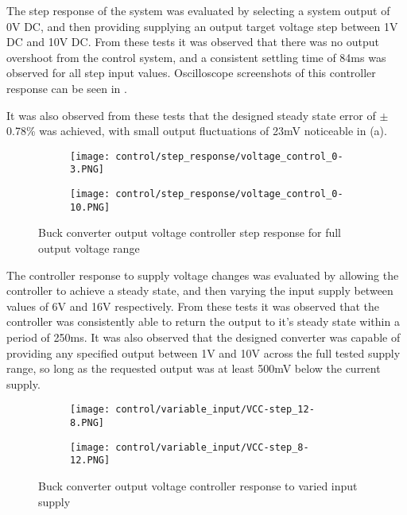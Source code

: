 The step response of the system was evaluated by selecting a system output of 0V DC, and then providing supplying an output target voltage step between 1V DC and 10V DC. From these tests it was observed that there was no output overshoot from the control system, and a consistent settling time of 84ms was observed for all step input values. Oscilloscope screenshots of this controller response can be seen in . 

It was also observed from these tests that the designed steady state error of $\pm$0.78\% was achieved, with small output fluctuations of 23mV noticeable in  (a).

\begin{figure}[H]
    \centering
    \begin{subfigure}{0.45\textwidth}
        \texttt{[image: control/step\_response/voltage\_control\_0-3.PNG]}
    \end{subfigure}
    \begin{subfigure}{0.45\textwidth}
        \texttt{[image: control/step\_response/voltage\_control\_0-10.PNG]}
    \end{subfigure}
    \caption{Buck converter output voltage controller step response for full output voltage range}
    \vspace{-10pt}
    \label{F:control_step}
\end{figure}

The controller response to supply voltage changes was evaluated by allowing the controller to achieve a steady state, and then varying the input supply between values of 6V and 16V respectively. From these tests it was observed that the controller was consistently able to return the output to it's steady state within a period of 250ms. It was also observed that the designed converter was capable of providing any specified output between 1V and 10V across the full tested supply range, so long as the requested output was at least 500mV below the current supply.

\begin{figure}[H]
    \centering
    \begin{subfigure}{0.45\textwidth}
        \texttt{[image: control/variable\_input/VCC-step\_12-8.PNG]}
    \end{subfigure}
    \begin{subfigure}{0.45\textwidth}
        \texttt{[image: control/variable\_input/VCC-step\_8-12.PNG]}
    \end{subfigure}
    \caption{Buck converter output voltage controller response to varied input supply}
    \vspace{-10pt}
    \label{F:Control_variable_input}
\end{figure}


